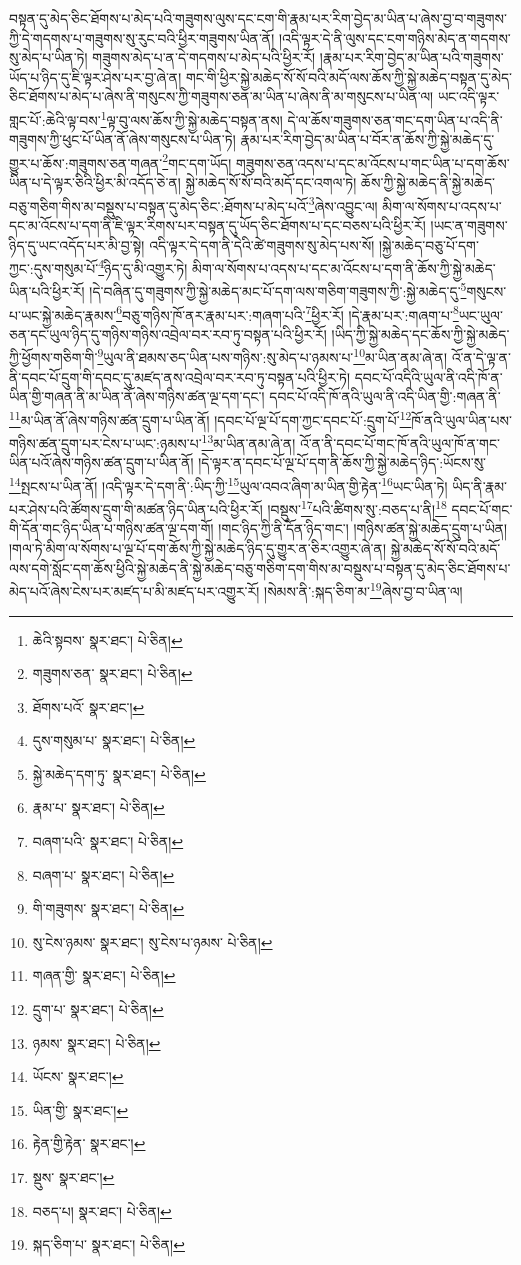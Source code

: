 བསྟན་དུ་མེད་ཅིང་ཐོགས་པ་མེད་པའི་གཟུགས་ལུས་དང་ངག་གི་རྣམ་པར་རིག་བྱེད་མ་ཡིན་པ་ཞེས་བྱ་བ་གཟུགས་ཀྱི་དེ་གདགས་པ་གཟུགས་སུ་རུང་བའི་ཕྱིར་གཟུགས་ཡིན་ནོ། །འདི་ལྟར་དེ་ནི་ལུས་དང་ངག་གཉིས་མེད་ན་གདགས་སུ་མེད་པ་ཡིན་ཏེ། གཟུགས་མེད་པ་ན་དེ་གདགས་པ་མེད་པའི་ཕྱིར་རོ། །རྣམ་པར་རིག་བྱེད་མ་ཡིན་པའི་གཟུགས་ཡོད་པ་ཉིད་དུ་ཇི་ལྟར་ཤེས་པར་བྱ་ཞེ་ན། གང་གི་ཕྱིར་སྐྱེ་མཆེད་སོ་སོ་བའི་མདོ་ལས་ཆོས་ཀྱི་སྐྱེ་མཆེད་བསྟན་དུ་མེད་ཅིང་ཐོགས་པ་མེད་པ་ཞེས་ནི་གསུངས་ཀྱི་གཟུགས་ཅན་མ་ཡིན་པ་ཞེས་ནི་མ་གསུངས་པ་ཡིན་ལ། ཡང་འདི་ལྟར་གླང་པོ་:ཆེའི་ལྟ་བས་\footnote{ཆེའི་སྟབས་  སྣར་ཐང་།  པེ་ཅིན། }ལྟ་བུ་ལས་ཆོས་ཀྱི་སྐྱེ་མཆེད་བསྟན་ནས། དེ་ལ་ཆོས་གཟུགས་ཅན་གང་དག་ཡིན་པ་འདི་ནི་གཟུགས་ཀྱི་ཕུང་པོ་ཡིན་ནོ་ཞེས་གསུངས་པ་ཡིན་ཏེ། རྣམ་པར་རིག་བྱེད་མ་ཡིན་པ་བོར་ན་ཆོས་ཀྱི་སྐྱེ་མཆེད་དུ་གྱུར་པ་ཆོས་:གཟུགས་ཅན་གཞན་\footnote{གཟུགས་ཅན་  སྣར་ཐང་།  པེ་ཅིན། }གང་དག་ཡོད། གཟུགས་ཅན་འདས་པ་དང་མ་འོངས་པ་གང་ཡིན་པ་དག་ཆོས་ཡིན་པ་དེ་ལྟར་ཅིའི་ཕྱིར་མི་འདོད་ཅེ་ན། སྐྱེ་མཆེད་སོ་སོ་བའི་མདོ་དང་འགལ་ཏེ། ཆོས་ཀྱི་སྐྱེ་མཆེད་ནི་སྐྱེ་མཆེད་བཅུ་གཅིག་གིས་མ་བསྡུས་པ་བསྟན་དུ་མེད་ཅིང་:ཐོགས་པ་མེད་པའོ་\footnote{ཐོགས་པའོ་  སྣར་ཐང་། }ཞེས་འབྱུང་ལ། མིག་ལ་སོགས་པ་འདས་པ་དང་མ་འོངས་པ་དག་ནི་ཇི་ལྟར་རིགས་པར་བསྟན་དུ་ཡོད་ཅིང་ཐོགས་པ་དང་བཅས་པའི་ཕྱིར་རོ། །ཡང་ན་གཟུགས་ཉིད་དུ་ཡང་འདོད་པར་མི་བྱ་སྟེ། འདི་ལྟར་དེ་དག་ནི་དེའི་ཚེ་གཟུགས་སུ་མེད་པས་སོ། །སྐྱེ་མཆེད་བཅུ་པོ་དག་ཀྱང་:དུས་གསུམ་པོ་\footnote{དུས་གསུམ་པ་  སྣར་ཐང་།  པེ་ཅིན། }ཉིད་དུ་མི་འགྱུར་ཏེ། མིག་ལ་སོགས་པ་འདས་པ་དང་མ་འོངས་པ་དག་ནི་ཆོས་ཀྱི་སྐྱེ་མཆེད་ཡིན་པའི་ཕྱིར་རོ། །དེ་བཞིན་དུ་གཟུགས་ཀྱི་སྐྱེ་མཆེད་མང་པོ་དག་ལས་གཅིག་གཟུགས་ཀྱི་:སྐྱེ་མཆེད་དུ་\footnote{སྐྱེ་མཆེད་དག་ཏུ་  སྣར་ཐང་།  པེ་ཅིན། }གསུངས་པ་ཡང་སྐྱེ་མཆེད་རྣམས་\footnote{རྣམ་པ་  སྣར་ཐང་།  པེ་ཅིན། }བཅུ་གཉིས་ཁོ་ནར་རྣམ་པར་:གཞག་པའི་\footnote{བཞག་པའི་  སྣར་ཐང་།  པེ་ཅིན། }ཕྱིར་རོ། །དེ་རྣམ་པར་:གཞག་པ་\footnote{བཞག་པ་  སྣར་ཐང་།  པེ་ཅིན། }ཡང་ཡུལ་ཅན་དང་ཡུལ་ཉིད་དུ་གཉིས་གཉིས་འབྲེལ་བར་རབ་ཏུ་བསྟན་པའི་ཕྱིར་རོ། །ཡིད་ཀྱི་སྐྱེ་མཆེད་དང་ཆོས་ཀྱི་སྐྱེ་མཆེད་ཀྱི་ཕྱོགས་གཅིག་གི་\footnote{གི་གཟུགས་  སྣར་ཐང་།  པེ་ཅིན། }ཡུལ་ནི་ཐམས་ཅད་ཡིན་པས་གཉིས་:སུ་མེད་པ་ཉམས་པ་\footnote{སུ་ངེས་ཉམས་  སྣར་ཐང་། སུ་ངེས་པ་ཉམས་  པེ་ཅིན། }མ་ཡིན་ནམ་ཞེ་ན། འོ་ན་དེ་ལྟ་ན་ནི་དབང་པོ་དྲུག་གི་དབང་དུ་མཛད་ནས་འབྲེལ་བར་རབ་ཏུ་བསྟན་པའི་ཕྱིར་ཏེ། དབང་པོ་འདིའི་ཡུལ་ནི་འདི་ཁོ་ན་ཡིན་གྱི་གཞན་ནི་མ་ཡིན་ནོ་ཞེས་གཉིས་ཚན་ལྔ་དག་དང་། དབང་པོ་འདི་ཁོ་ནའི་ཡུལ་ནི་འདི་ཡིན་གྱི་:གཞན་ནི་\footnote{གཞན་གྱི་  སྣར་ཐང་།  པེ་ཅིན། }མ་ཡིན་ནོ་ཞེས་གཉིས་ཚན་དྲུག་པ་ཡིན་ནོ། །དབང་པོ་ལྔ་པོ་དག་ཀྱང་དབང་པོ་:དྲུག་པོ་\footnote{དྲུག་པ་  སྣར་ཐང་།  པེ་ཅིན། }ཁོ་ནའི་ཡུལ་ཡིན་པས་གཉིས་ཚན་དྲུག་པར་ངེས་པ་ཡང་:ཉམས་པ་\footnote{ཉམས་  སྣར་ཐང་།  པེ་ཅིན། }མ་ཡིན་ནམ་ཞེ་ན། འོ་ན་ནི་དབང་པོ་གང་ཁོ་ནའི་ཡུལ་ཁོ་ན་གང་ཡིན་པའོ་ཞེས་གཉིས་ཚན་དྲུག་པ་ཡིན་ནོ། །དེ་ལྟར་ན་དབང་པོ་ལྔ་པོ་དག་ནི་ཆོས་ཀྱི་སྐྱེ་མཆེད་ཉིད་:ཡོངས་སུ་\footnote{ཡོངས་  སྣར་ཐང་། }སྤངས་པ་ཡིན་ནོ། །འདི་ལྟར་དེ་དག་ནི་:ཡིད་ཀྱི་\footnote{ཡིན་གྱི་  སྣར་ཐང་། }ཡུལ་འབའ་ཞིག་མ་ཡིན་གྱི་རྟེན་\footnote{རྟེན་གྱི་རྟེན་  སྣར་ཐང་། }ཡང་ཡིན་ཏེ། ཡིད་ནི་རྣམ་པར་ཤེས་པའི་ཚོགས་དྲུག་གི་མཚན་ཉིད་ཡིན་པའི་ཕྱིར་རོ། །བསྡུས་\footnote{སྡུས་  སྣར་ཐང་། }པའི་ཚིགས་སུ་:བཅད་པ་ནི།\footnote{བཅད་པ།  སྣར་ཐང་།  པེ་ཅིན། } དབང་པོ་གང་གི་དོན་གང་ཉིད་ཡིན་པ་གཉིས་ཚན་ལྔ་དག་གོ། །གང་ཉིད་ཀྱི་ནི་དོན་ཉིད་གང་། །གཉིས་ཚན་སྐྱེ་མཆེད་དྲུག་པ་ཡིན། །གལ་ཏེ་མིག་ལ་སོགས་པ་ལྔ་པོ་དག་ཆོས་ཀྱི་སྐྱེ་མཆེད་ཉིད་དུ་གྱུར་ན་ཅིར་འགྱུར་ཞེ་ན། སྐྱེ་མཆེད་སོ་སོ་བའི་མདོ་ལས་དགེ་སློང་དག་ཆོས་ཕྱིའི་སྐྱེ་མཆེད་ནི་སྐྱེ་མཆེད་བཅུ་གཅིག་དག་གིས་མ་བསྡུས་པ་བསྟན་དུ་མེད་ཅིང་ཐོགས་པ་མེད་པའོ་ཞེས་ངེས་པར་མཛད་པ་མི་མཛད་པར་འགྱུར་རོ། །སེམས་ནི་:སྐད་ཅིག་མ་\footnote{སྐད་ཅིག་པ་  སྣར་ཐང་།  པེ་ཅིན། }ཞེས་བྱ་བ་ཡིན་ལ། 
